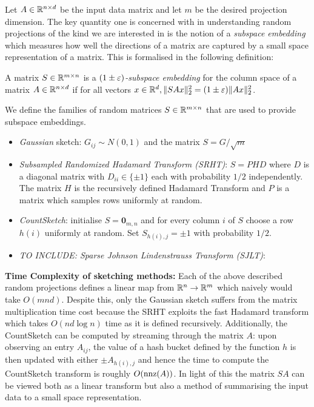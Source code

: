 
Let $A \in \mathbb{R}^{n \times d}$ be the input data matrix and let $m$ be the
desired projection dimension.
The key quantity one is concerned with in understanding random projections of
the kind we are interested in is the notion of a \textit{subspace embedding}
which measures how well the directions of a matrix are captured by a small
space representation of a matrix.
This is formalised in the following definition:

\begin{mydef} \label{def: subspace-embedding}
  A matrix $S \in \mathbb{R}^{m \times n}$ is a \textit{$(1 \pm \varepsilon)$-subspace embedding}
  for the column space of a matrix $A \in \mathbb{R}^{n \times d}$ if for all vectors
  $x \in \mathbb{R}^d, \|SAx\|_2^2 = (1 \pm \varepsilon)\|Ax\|_2^2$.
\end{mydef}

\noindent We define the families of random matrices $S \in \mathbb{R}^{m \times n}$ that
are used to provide subspace embeddings.

\begin{itemize}
  \item \textit{Gaussian} sketch: $G_{ij} \sim N(0,1)$ and the matrix
  $S = G/\sqrt{m}$
  \item \textit{Subsampled Randomized Hadamard Transform (SRHT)}: $S = PHD$
  where $D$ is a diagonal matrix with $D_{ii} \in \{ \pm 1 \}$ each with
  probability $1/2$ independently.
  The matrix $H$ is the recursively defined Hadamard Transform and $P$ is
  a matrix
  which samples rows uniformly at random.
  \item \textit{CountSketch}: initialise $S = \mathbf{0}_{m,n}$ and for every
  column $i$ of $S$ choose a row $h(i)$ uniformly at random.
  Set $S_{h(i),j} = \pm 1$ with probability $1/2$.
  \item{\textit{TO INCLUDE: Sparse Johnson Lindenstrauss Transform (SJLT)}:}
\end{itemize}

\textbf{Time Complexity of sketching methods:}
Each of the above described random projections defines a linear map from $\mathbb{R}^n
\to \mathbb{R}^m$ which naively would take $O(mnd)$.
Despite this, only the Gaussian sketch suffers from the matrix multiplication
time cost because the SRHT exploits the fast Hadamard transform which takes
$O(nd \log n)$ time as it is defined recursively.
Additionally, the CountSketch can be computed by streaming through the matrix
$A$: upon observing an entry $A_{ij}$, the value of a hash bucket defined
by the function $h$ is then updated with either $\pm A_{h(i),j}$ and hence
the time
to compute the CountSketch transform is roughly $O(\text{nnz}(A))$.
In light of this the matrix $SA$ can be viewed both as a linear transform but
also a method of summarising the input data to a small space representation.

